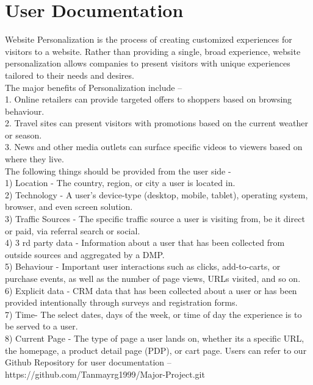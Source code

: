 \newpage
\chapter{User Documentation }
Website Personalization is the process of creating customized experiences for
visitors to a website. Rather than providing a single, broad experience, website
personalization allows companies to present visitors with unique experiences tailored
to their needs and desires.\\
The major benefits of Personalization include –\\
1. Online retailers can provide targeted offers to shoppers based on browsing
behaviour.\\
2. Travel sites can present visitors with promotions based on the current weather
or season.\\
3. News and other media outlets can surface specific videos to viewers based
on where they live.\\
The following things should be provided from the user side -\\
1) Location - The country, region, or city a user is located in.\\
2) Technology - A user’s device-type (desktop, mobile, tablet), operating system,
browser, and even screen solution.\\
3) Traffic Sources - The specific traffic source a user is visiting from, be it direct
or paid, via referral search or social.\\
4) 3 rd party data - Information about a user that has been collected from outside
sources and aggregated by a DMP.\\
5) Behaviour - Important user interactions such as clicks, add-to-carts, or
purchase events, as well as the number of page views, URLs visited, and so
on.\\
6) Explicit data - CRM data that has been collected about a user or has been
provided intentionally through surveys and registration forms.\\
7) Time- The select dates, days of the week, or time of day the experience is to
be served to a user.\\
8) Current Page - The type of page a user lands on, whether its a specific URL,
the homepage, a product detail page (PDP), or cart page.
Users can refer to our Github Repository for user documentation –
https://github.com/Tanmayrg1999/Major-Project.git
